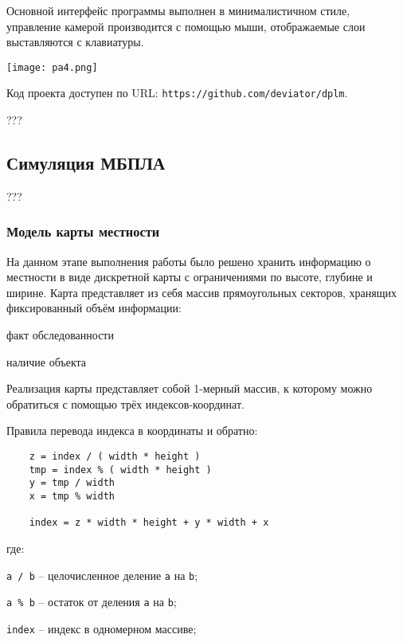 Основной интерфейс программы выполнен в минималистичном стиле, управление
камерой производится с помощью мыши, отображаемые слои выставляются с клавиатуры.

\vspace{1em}

\texttt{[image: pa4.png]}

Код проекта доступен по URL: \verb|https://github.com/deviator/dplm|.

???

\newpage
\subsection{Симуляция МБПЛА}

???

\newpage
\subsubsection{Модель карты местности}

На данном этапе выполнения работы было решено хранить информацию о местности в
виде дискретной карты с ограничениями по высоте, глубине и ширине. Карта
представляет из себя массив прямоугольных секторов, хранящих фиксированный объём
информации:
\begin{mintemize}
    \item факт обследованности
    \item наличие объекта
\end{mintemize}

Реализация карты представляет собой 1-мерный массив, к которому можно обратиться с помощью трёх
индексов-координат.

Правила перевода индекса в координаты и обратно:

\begin{verbatim}
    z = index / ( width * height )
    tmp = index % ( width * height )
    y = tmp / width
    x = tmp % width

    index = z * width * height + y * width + x
\end{verbatim}
\vspace{-0.5em}

где:

\verb|a / b| -- целочисленное деление \verb|a| на \verb|b|;

\verb|a % b| -- остаток от деления \verb|a| на \verb|b|;

\verb|index| -- индекс в одномерном массиве;


